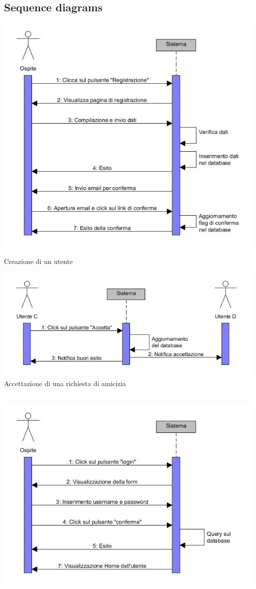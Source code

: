 \documentclass[a4paper,12pt]{article}
\begin{document}
\subsection{Sequence diagrams}
\begin{center}
\includegraphics[scale=0.75]{sDiagrams/creazioneUtente.jpg}
\caption{Creazione di un utente}
\vspace*{\fill}
\includegraphics[scale=0.75]{sDiagrams/accettazioneAmicizia.jpg} \\
\caption{Accettazione di una richiesta di amicizia} \\
\clearpage
\includegraphics[scale=0.75]{sDiagrams/login.jpg} \\

\end{center}
\end{document}
